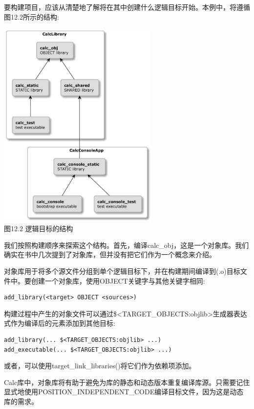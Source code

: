 
要构建项目，应该从清楚地了解将在其中创建什么逻辑目标开始。本例中，将遵循图12.2所示的结构:

\begin{center}
\includegraphics[width=0.6\textwidth]{content/3/chapter12/images/2.jpg}\\
图12.2 逻辑目标的结构
\end{center}

我们按照构建顺序来探索这个结构。首先，编译calc\_obj，这是一个对象库。我们确实在书中几次提到了对象库，但并没有把它们作为一个概念来介绍。


对象库用于将多个源文件分组到单个逻辑目标下，并在构建期间编译到(.o)目标文件中。要创建一个对象库，使用OBJECT关键字与其他关键字相同:

\begin{lstlisting}[style=styleCMake]
add_library(<target> OBJECT <sources>)
\end{lstlisting}

构建过程中产生的对象文件可以通过\$<TARGET\_OBJECTS:objlib>生成器表达式作为编译后的元素添加到其他目标:

\begin{lstlisting}[style=styleCMake]
add_library(... $<TARGET_OBJECTS:objlib> ...)
add_executable(... $<TARGET_OBJECTS:objlib> ...)
\end{lstlisting}

或者，可以使用target\_link\_libraries()将它们作为依赖项添加。

Calc库中，对象库将有助于避免为库的静态和动态版本重复编译库源。只需要记住显式地使用POSITION\_INDEPENDENT\_CODE编译目标文件，因为这是动态库的需求。

